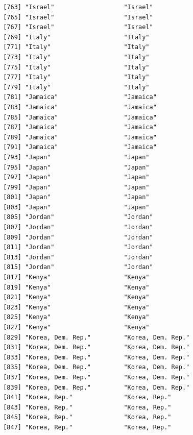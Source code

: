 \documentclass[
  letterpaper,
  DIV=11,
  numbers=noendperiod]{scrreprt}
\begin{document}
\begin{verbatim}
 [763] "Israel"                   "Israel"                  
 [765] "Israel"                   "Israel"                  
 [767] "Israel"                   "Israel"                  
 [769] "Italy"                    "Italy"                   
 [771] "Italy"                    "Italy"                   
 [773] "Italy"                    "Italy"                   
 [775] "Italy"                    "Italy"                   
 [777] "Italy"                    "Italy"                   
 [779] "Italy"                    "Italy"                   
 [781] "Jamaica"                  "Jamaica"                 
 [783] "Jamaica"                  "Jamaica"                 
 [785] "Jamaica"                  "Jamaica"                 
 [787] "Jamaica"                  "Jamaica"                 
 [789] "Jamaica"                  "Jamaica"                 
 [791] "Jamaica"                  "Jamaica"                 
 [793] "Japan"                    "Japan"                   
 [795] "Japan"                    "Japan"                   
 [797] "Japan"                    "Japan"                   
 [799] "Japan"                    "Japan"                   
 [801] "Japan"                    "Japan"                   
 [803] "Japan"                    "Japan"                   
 [805] "Jordan"                   "Jordan"                  
 [807] "Jordan"                   "Jordan"                  
 [809] "Jordan"                   "Jordan"                  
 [811] "Jordan"                   "Jordan"                  
 [813] "Jordan"                   "Jordan"                  
 [815] "Jordan"                   "Jordan"                  
 [817] "Kenya"                    "Kenya"                   
 [819] "Kenya"                    "Kenya"                   
 [821] "Kenya"                    "Kenya"                   
 [823] "Kenya"                    "Kenya"                   
 [825] "Kenya"                    "Kenya"                   
 [827] "Kenya"                    "Kenya"                   
 [829] "Korea, Dem. Rep."         "Korea, Dem. Rep."        
 [831] "Korea, Dem. Rep."         "Korea, Dem. Rep."        
 [833] "Korea, Dem. Rep."         "Korea, Dem. Rep."        
 [835] "Korea, Dem. Rep."         "Korea, Dem. Rep."        
 [837] "Korea, Dem. Rep."         "Korea, Dem. Rep."        
 [839] "Korea, Dem. Rep."         "Korea, Dem. Rep."        
 [841] "Korea, Rep."              "Korea, Rep."             
 [843] "Korea, Rep."              "Korea, Rep."             
 [845] "Korea, Rep."              "Korea, Rep."             
 [847] "Korea, Rep."              "Korea, Rep."             

\end{verbatim}
\end{document}
